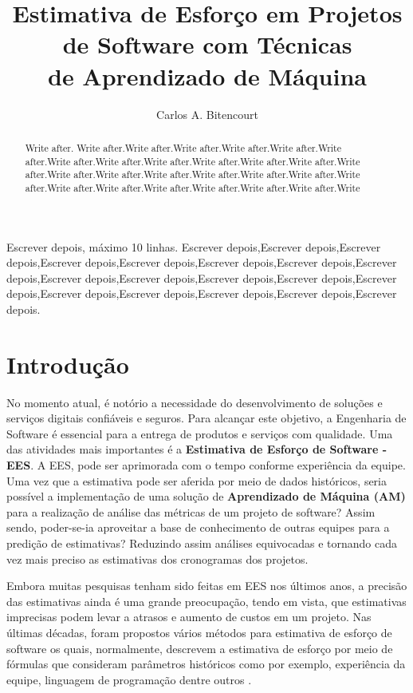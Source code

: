 \documentclass[12pt]{article}
\title{Estimativa de Esforço em Projetos de Software com Técnicas\\ de Aprendizado de Máquina}
\author{Carlos A. Bitencourt\inst{1}}
\begin{document}
\maketitle

\begin{abstract}
  Write after. Write after.Write after.Write after.Write after.Write after.Write after.Write after.Write after.Write after.Write after.Write after.Write after.Write after.Write after.Write after.Write after.Write after.Write after.Write after.Write after.Write after.Write after.Write after.Write after.Write after.Write after.Write
\end{abstract}

\begin{resumo}
  Escrever depois, máximo 10 linhas. Escrever depois,Escrever depois,Escrever depois,Escrever depois,Escrever depois,Escrever depois,Escrever depois,Escrever depois,Escrever depois,Escrever depois,Escrever depois,Escrever depois,Escrever depois,Escrever depois,Escrever depois,Escrever depois,Escrever depois,Escrever depois.

\end{resumo}

\section{Introdução}

No momento atual, é notório a necessidade do desenvolvimento de soluções e serviços digitais confiáveis e seguros. Para alcançar este objetivo, a Engenharia de Software é essencial para a entrega de produtos e serviços com qualidade. Uma das atividades mais importantes é a \textbf{Estimativa de Esforço de Software - EES}. A EES, pode ser aprimorada com o tempo conforme experiência da equipe. Uma vez que a estimativa pode ser aferida por meio de dados históricos, seria possível a implementação de uma solução de \textbf{Aprendizado de Máquina (AM)} para a realização de análise das métricas de um projeto de software? Assim sendo, poder-se-ia aproveitar a base de conhecimento de outras equipes para a predição de estimativas? Reduzindo assim análises equivocadas e tornando cada vez mais preciso as estimativas dos cronogramas dos projetos.

Embora muitas pesquisas tenham sido feitas em EES nos últimos anos, a precisão das estimativas  ainda é uma grande preocupação, tendo em vista, que estimativas imprecisas podem levar a atrasos e aumento de custos em um projeto. Nas últimas décadas, foram propostos vários métodos para estimativa de esforço de software os quais, normalmente, descrevem a estimativa de esforço por meio de fórmulas que consideram parâmetros históricos como por exemplo, experiência da equipe, linguagem de programação dentre outros \cite{asadegravino:2019}.
\end{document}

